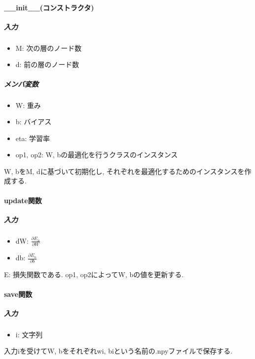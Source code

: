 \documentclass[a4j, titlepage]{jarticle}
\begin{document}
        \paragraph*{\_\_init\_\_(コンストラクタ)}
            \subparagraph*{入力}
            \begin{itemize}
                \item M: 次の層のノード数
                \item d: 前の層のノード数
            \end{itemize}
            \subparagraph*{メンバ変数}
            \begin{itemize}
                \item W: 重み
                \item b: バイアス
                \item eta: 学習率
                \item op1, op2: W, bの最適化を行うクラスのインスタンス
            \end{itemize}
            W, bをM, dに基づいて初期化し, それぞれを最適化するためのインスタンスを作成する.
        \paragraph*{update関数}
            \subparagraph*{入力}
            \begin{itemize}
                \item dW: \(\displaystyle \frac{\partial E_n}{\partial W}\)
                \item db: \(\displaystyle \frac{\partial E_n}{\partial b}\)
            \end{itemize}
            E: 損失関数である.
            op1, op2によってW, bの値を更新する.
        \paragraph*{save関数}
            \subparagraph*{入力}
            \begin{itemize}
                \item i: 文字列
            \end{itemize}
            入力iを受けてW, bをそれぞれwi, biという名前の.npyファイルで保存する.
\end{document}
